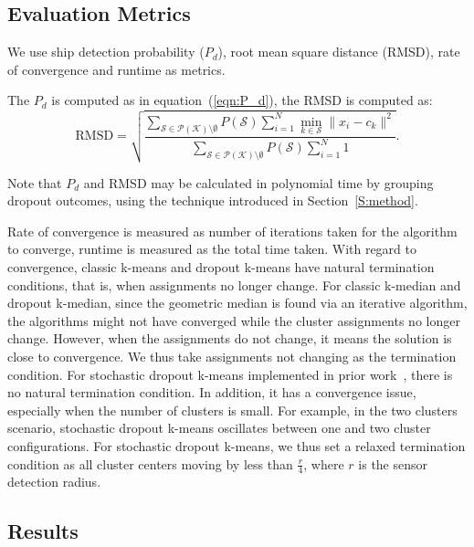 \documentclass{article}
\begin{document}
\subsection{Evaluation Metrics}

We use ship detection probability ($P_d$), root mean square distance (RMSD), rate of convergence and runtime as metrics. 

The $P_d$ is computed as in equation~(\ref{eqn:P_d}), the RMSD is computed as:
\begin{equation}
    \text{RMSD} = \sqrt{\frac{\sum_{\mathcal{S}\in\mathcal{P}(\mathcal{K})\setminus\emptyset} P(\mathcal{S}) \sum_{i=1}^N \min_{k\in \mathcal{S}} \|x_i-c_k\|^2}{\sum_{\mathcal{S}\in\mathcal{P}(\mathcal{K})\setminus\emptyset} P(\mathcal{S}) \sum_{i=1}^N 1}}.
\end{equation}

Note that $P_d$ and RMSD may be calculated in polynomial time by grouping dropout outcomes, using the technique introduced in Section~\ref{S:method}. 

Rate of convergence is measured as number of iterations taken for the algorithm to converge, runtime is measured as the total time taken. With regard to convergence, classic k-means and dropout k-means have natural termination conditions, that is, when assignments no longer change. For classic k-median and dropout k-median, since the geometric median is found via an iterative algorithm, the algorithms might not have converged while the cluster assignments no longer change. However, when the assignments do not change, it means the solution is close to convergence. We thus take assignments not changing as the termination condition. For stochastic dropout k-means implemented in prior work~\cite{zhang2016_dropoutkmeans}, there is no natural termination condition. In addition, it has a convergence issue, especially when the number of clusters is small. For example, in the two clusters scenario, stochastic dropout k-means oscillates between one and two cluster configurations. For stochastic dropout k-means, we thus set a relaxed termination condition as all cluster centers moving by less than $\frac{r}{4}$, where $r$ is the sensor detection radius. 

\subsection{Results}
\end{document}
